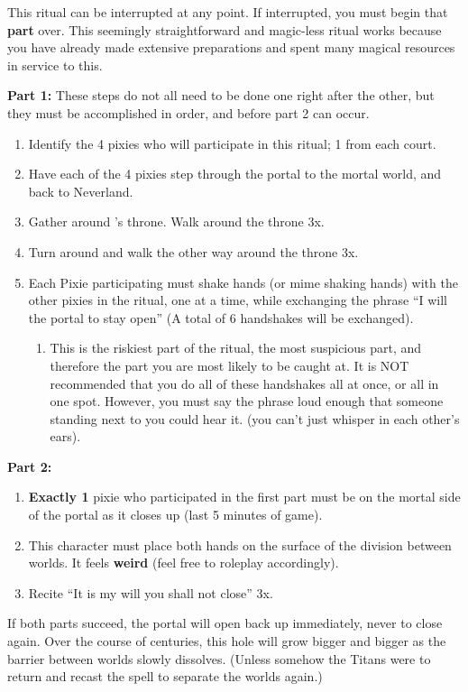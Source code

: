 \documentclass[green]{PP}
\begin{document}
\name{\gPortal{}}

This ritual can be interrupted at any point. If interrupted, you must begin that \textbf{part} over. This seemingly straightforward and magic-less ritual works because you have already made extensive preparations and spent many magical resources in service to this.

\textbf{Part 1:}
These steps do not all need to be done one right after the other, but they must be accomplished in order, and before part 2 can occur.
\begin{enumerate}
	\item Identify the 4 pixies who will participate in this ritual; 1 from each court.
	\item Have each of the 4 pixies step through the portal to the mortal world, and back to Neverland.
	\item Gather around \cSHead{}’s throne. Walk around the throne 3x.
	\item Turn around and walk the other way around the throne 3x.
	\item Each Pixie participating must shake hands (or mime shaking hands) with the other pixies in the ritual, one at a time, while exchanging the phrase “I will the portal to stay open” (A total of 6 handshakes will be exchanged).
	\begin{enumerate}
		\item This is the riskiest part of the ritual, the most suspicious part, and therefore the part you are most likely to be caught at. It is NOT recommended that you do all of these handshakes all at once, or all in one spot. However, you must say the phrase loud enough that someone standing next to you could hear it. (you can’t just whisper in each other’s ears).
	\end{enumerate}
\end{enumerate}

\textbf{Part 2:}
\begin{enumerate}
	\item \textbf{Exactly 1} pixie who participated in the first part must be on the mortal side of the portal as it closes up (last 5 minutes of game).
	\item This character must place both hands on the surface of the division between worlds. It feels \textbf{weird} (feel free to roleplay accordingly).
	\item Recite “It is my will you shall not close” 3x.
\end{enumerate}

If both parts succeed, the portal will open back up immediately, never to close again. Over the course of centuries, this hole will grow bigger and bigger as the barrier between worlds slowly dissolves. (Unless somehow the Titans were to return and recast the spell to separate the worlds again.)
\end{document}
